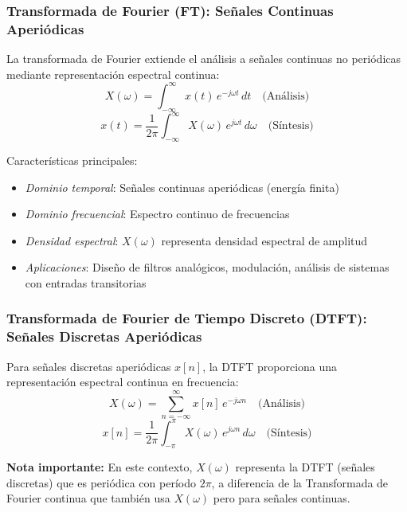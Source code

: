 \documentclass[
  11pt,
  letterpaper,
   addpoints,
   answers
  ]{exam}
\begin{document}
\subsubsection*{Transformada de Fourier (FT): Señales Continuas Aperiódicas}
La transformada de Fourier extiende el análisis a señales continuas no periódicas mediante representación espectral continua:
\begin{equation}
X(\omega) = \int_{-\infty}^{\infty} x(t)\,e^{-j\omega t}\,dt \quad \text{(Análisis)}
\end{equation}
\begin{equation}
x(t) = \frac{1}{2\pi}\int_{-\infty}^{\infty} X(\omega)\,e^{j\omega t}\,d\omega \quad \text{(Síntesis)}
\end{equation}

Características principales:
\begin{itemize}
\item \textit{Dominio temporal}: Señales continuas aperiódicas (energía finita)
\item \textit{Dominio frecuencial}: Espectro continuo de frecuencias
\item \textit{Densidad espectral}: \(X(\omega)\) representa densidad espectral de amplitud
\item \textit{Aplicaciones}: Diseño de filtros analógicos, modulación, análisis de sistemas con entradas transitorias
\end{itemize}

\subsubsection*{Transformada de Fourier de Tiempo Discreto (DTFT): Señales Discretas Aperiódicas}
Para señales discretas aperiódicas \(x[n]\), la DTFT proporciona una representación espectral continua en frecuencia:
\begin{equation}
X(\omega) = \sum_{n=-\infty}^{\infty} x[n]\,e^{-j\omega n} \quad \text{(Análisis)}
\end{equation}
\begin{equation}
x[n] = \frac{1}{2\pi}\int_{-\pi}^{\pi} X(\omega)\,e^{j\omega n}\,d\omega \quad \text{(Síntesis)}
\end{equation}

\textbf{Nota importante:} En este contexto, $X(\omega)$ representa la DTFT (señales discretas) que es periódica con período $2\pi$, a diferencia de la Transformada de Fourier continua que también usa $X(\omega)$ pero para señales continuas.
\end{document}
